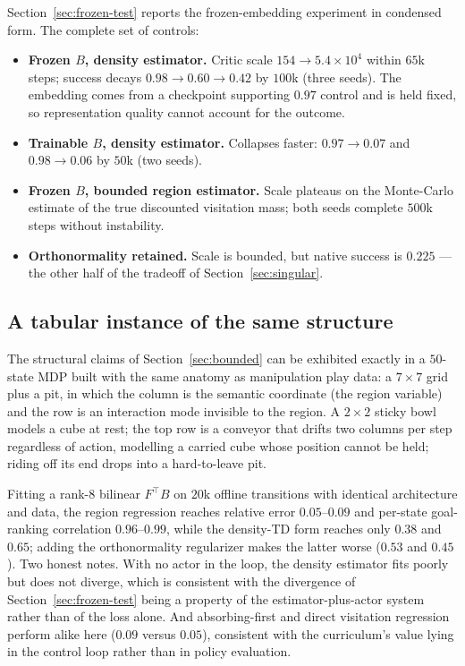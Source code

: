 \documentclass{article}
\begin{document}
Section~\ref{sec:frozen-test} reports the frozen-embedding experiment in condensed
form. The complete set of controls:

\begin{itemize}
\item \textbf{Frozen $B$, density estimator.} Critic scale
$154\to5.4\times10^{4}$ within $65$k steps; success decays $0.98\to0.60\to0.42$ by
$100$k (three seeds). The embedding comes from a checkpoint supporting $0.97$
control and is held fixed, so representation quality cannot account for the
outcome.
\item \textbf{Trainable $B$, density estimator.} Collapses faster:
$0.97\to0.07$ and $0.98\to0.06$ by $50$k (two seeds).
\item \textbf{Frozen $B$, bounded region estimator.} Scale plateaus on the
Monte-Carlo estimate of the true discounted visitation mass; both seeds complete
$500$k steps without instability.
\item \textbf{Orthonormality retained.} Scale is bounded, but native success is
$0.225$ --- the other half of the tradeoff of Section~\ref{sec:singular}.
\end{itemize}

\subsection{A tabular instance of the same structure}
\label{app:playpen}

The structural claims of Section~\ref{sec:bounded} can be exhibited exactly in a
$50$-state MDP built with the same anatomy as manipulation play data: a
$7\times7$ grid plus a pit, in which the column is the semantic coordinate (the
region variable) and the row is an interaction mode invisible to the region. A
$2\times2$ sticky bowl models a cube at rest; the top row is a conveyor that
drifts two columns per step regardless of action, modelling a carried cube whose
position cannot be held; riding off its end drops into a hard-to-leave pit.

Fitting a rank-$8$ bilinear $F^{\top}B$ on $20$k offline transitions with
identical architecture and data, the region regression reaches relative error
$0.05$--$0.09$ and per-state goal-ranking correlation $0.96$--$0.99$, while the
density-TD form reaches only $0.38$ and $0.65$; adding the orthonormality
regularizer makes the latter worse ($0.53$ and $0.45$). Two honest notes. With no
actor in the loop, the density estimator fits poorly but does not diverge, which
is consistent with the divergence of Section~\ref{sec:frozen-test} being a
property of the estimator-plus-actor system rather than of the loss alone. And
absorbing-first and direct visitation regression perform alike here ($0.09$ versus
$0.05$), consistent with the curriculum's value lying in the control loop rather
than in policy evaluation.
\end{document}
